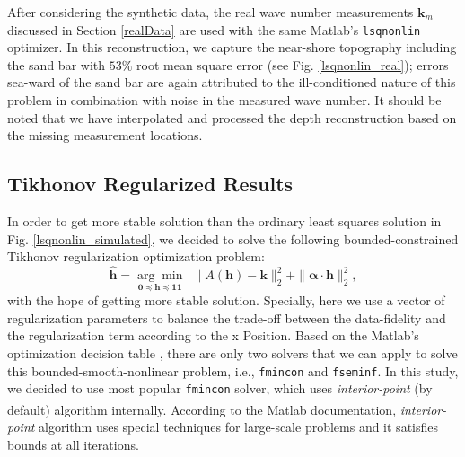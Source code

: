 After considering the synthetic data, the real wave number measurements $\mathbf{k}_m$ discussed in Section \ref{realData} are used with the same Matlab's \verb|lsqnonlin| optimizer. In this reconstruction, we capture the near-shore topography including the sand bar with $53\%$ root mean square error (see Fig. \ref{lsqnonlin_real}); errors sea-ward of the sand bar are again attributed to the ill-conditioned nature of this problem in combination with noise in the measured wave number. It should be noted that we have interpolated and processed the depth reconstruction based on the missing measurement locations. 


\subsection{Tikhonov Regularized Results} \label{TickReg}

In order to get more stable solution than the ordinary least squares solution in Fig. \ref{lsqnonlin_simulated}, we decided to solve the following bounded-constrained Tikhonov regularization optimization problem:
\begin{equation}\label{LS-regBC}
\mathbf{\hat{h}} = \underset{\mathbf{0} \preceq \mathbf{h} \preceq \mathbf{11}}{\arg \min} \ \ \|  A(\mathbf{h}) -  \mathbf{k} \|_2^2  +   \| \boldsymbol{\alpha} \cdot  \mathbf{h}\|_2^2,
\end{equation}
with the hope of getting more stable solution. Specially, here we use a vector of regularization parameters to balance the trade-off between the data-fidelity and the regularization term according to the x Position. Based on the Matlab's optimization decision table \cite{descTable}, there are only two solvers that we can apply to solve this bounded-smooth-nonlinear problem, i.e., \verb|fmincon| and \verb|fseminf|. In this study, we decided to use  most popular \verb|fmincon| solver, which uses \textit{interior-point} (by default) algorithm internally. According to the Matlab\textsuperscript{\textregistered} documentation, \textit{interior-point} algorithm uses special techniques for large-scale problems and it satisfies bounds at all iterations. 

